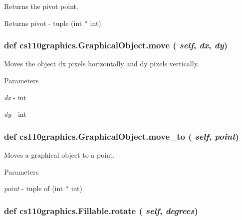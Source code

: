 Returns the pivot point. \begin{DoxyReturn}{Returns}
pivot -\/ tuple (int $\ast$ int) 
\end{DoxyReturn}
\hypertarget{classcs110graphics_1_1GraphicalObject_aa64d270fb83efa4a54e1a7953512f9cd}{
\subsubsection[{move}]{\setlength{\rightskip}{0pt plus 5cm}def cs110graphics.GraphicalObject.move ( {\em self}, \/   {\em dx}, \/   {\em dy})}}
\label{classcs110graphics_1_1GraphicalObject_aa64d270fb83efa4a54e1a7953512f9cd}


Moves the object dx pixels horizontally and dy pixels vertically. 
\begin{DoxyParams}{Parameters}
\item[{\em dx}]-\/ int \item[{\em dy}]-\/ int \end{DoxyParams}
\hypertarget{classcs110graphics_1_1GraphicalObject_abe2d480265df7ac9447205c52c6946df}{
\subsubsection[{move\_\-to}]{\setlength{\rightskip}{0pt plus 5cm}def cs110graphics.GraphicalObject.move\_\-to ( {\em self}, \/   {\em point})}}
\label{classcs110graphics_1_1GraphicalObject_abe2d480265df7ac9447205c52c6946df}


Moves a graphical object to a point. 
\begin{DoxyParams}{Parameters}
\item[{\em point}]-\/ tuple of (int $\ast$ int) \end{DoxyParams}
\hypertarget{classcs110graphics_1_1Fillable_afa6710f6c314de39d19f06d9dd306d7d}{
\subsubsection[{rotate}]{\setlength{\rightskip}{0pt plus 5cm}def cs110graphics.Fillable.rotate ( {\em self}, \/   {\em degrees})}}
\label{classcs110graphics_1_1Fillable_afa6710f6c314de39d19f06d9dd306d7d}


